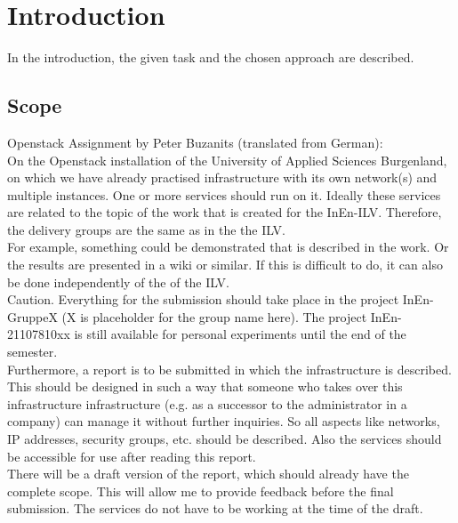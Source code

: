 \section{Introduction}
In the introduction, the given task and the chosen approach are described.

\subsection{Scope}

Openstack Assignment by Peter Buzanits (translated from German): \\

\noindent
On the Openstack installation of the University of Applied Sciences 
Burgenland, on which we have already practised
infrastructure with its own network(s) and multiple instances.
One or more services should run on it. Ideally
these services are related to the topic of the work that is created for the
InEn-ILV. Therefore, the delivery groups are the same as in the
the ILV. \\

\noindent
For example, something could be demonstrated that is described in the work.
Or the results are presented in a wiki or similar.
If this is difficult to do, it can also be done independently of the
of the ILV. \\

\noindent
Caution. Everything for the submission should take place in the project InEn-GruppeX (X is
placeholder for the group name here). The project InEn-21107810xx is still available
for personal experiments until the end of the semester. \\

\noindent
Furthermore, a report is to be submitted in which the infrastructure is described.
This should be designed in such a way that someone who takes over this infrastructure
infrastructure (e.g. as a successor to the administrator in a company) can manage it without
further inquiries. So all aspects like networks,
IP addresses, security groups, etc. should be described. Also the services should
be accessible for use after reading this report. \\

\noindent
There will be a draft version of the report, which should already have the complete scope.
This will allow me to provide feedback before the final submission. The services
do not have to be working at the time of the draft. \\

